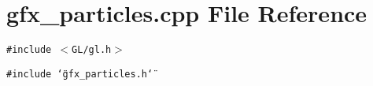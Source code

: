 \section{gfx\_\-particles.cpp File Reference}
\label{gfx__particles_8cpp}
{\tt \#include $<$GL/gl.h$>$}\par
{\tt \#include \char`\"{}gfx\_\-particles.h\char`\"{}}\par
